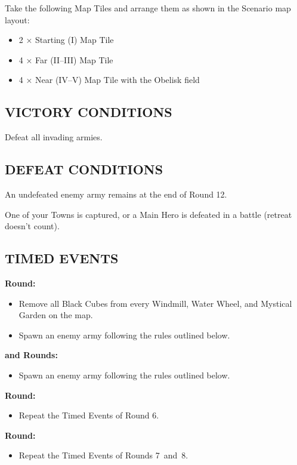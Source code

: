 \begin{multicols}{2}
Take the following Map Tiles and arrange them as shown in the Scenario map layout:

\begin{itemize}
	\item 2 × Starting (I) Map Tile
	\item 4 × Far (II--III) Map Tile
	\item 4 × Near (IV--V) Map Tile with the Obelisk field
\end{itemize}

\subsection*{\MakeUppercase{Victory Conditions}}

Defeat all invading armies.

\subsection*{\MakeUppercase{Defeat Conditions}}

An undefeated enemy army remains at the end of Round 12.

One of your Towns is captured, or a Main Hero is defeated in a battle (retreat doesn't count).

\subsection*{\MakeUppercase{Timed Events}}

\textbf{ Round:}
\begin{itemize}
  \item Remove all Black Cubes from every Windmill, Water Wheel, and Mystical Garden on the map.
  \item Spawn an enemy army following the rules outlined below.
\end{itemize}

\textbf{ and  Rounds:}
\begin{itemize}
  \item Spawn an enemy army following the rules outlined below.
\end{itemize}

\textbf{ Round:}
\begin{itemize}
  \item Repeat the Timed Events of Round 6.
\end{itemize}

\textbf{ Round:}
\begin{itemize}
  \item Repeat the Timed Events of Rounds \mbox{7 and 8.}
\end{itemize}
\vspace{-0.5em}


\end{multicols}
